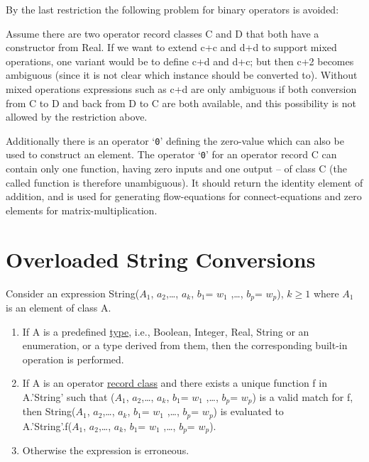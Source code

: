 \begin{nonnormative}
By the last restriction the following problem for binary
operators is avoided:

Assume there are two operator record classes C and D that both
have a constructor from Real. If we want to extend c+c and d+d to
support mixed operations, one variant would be to define c+d and d+c;
but then c+2 becomes ambiguous (since it is not clear which instance
should be converted to). Without mixed operations expressions such as
c+d are only ambiguous if both conversion from C to D and back from D to
C are both available, and this possibility is not allowed by the
restriction above.
\end{nonnormative}

Additionally there is an operator `\lstinline!0!' defining the zero-value which can
also be used to construct an element. The operator `\lstinline!0!' for an operator
record C can contain only one function, having zero inputs and one
output -- of class C (the called function is therefore unambiguous). It
should return the identity element of addition, and is used for
generating flow-equations for connect-equations and zero elements for
matrix-multiplication.

\section{Overloaded String Conversions}

Consider an expression String($A_1$,
$a_{2}$,\ldots{}, $a_{k}$, $b_{1}$=
$w_{1}$ ,\ldots{}, $b_{p}$= $w_{p}$), $k\ge 1$ where $A_1$ is an element of class A.

\begin{enumerate}
\item
  If A is a predefined \underline{type}, i.e., Boolean, Integer, Real, String or
  an enumeration, or a type derived from them, then the corresponding
  built-in operation is performed.
\item
  If A is an operator \underline{record class} and there exists a unique function
  f in A.'String' such that ($A_1$,
  $a_{2}$,\ldots{}, $a_{k}$, $b_{1}$=
  $w_{1}$ ,\ldots{}, $b_{p}$= $w_{p}$)
  is a valid match for f, then String($A_1$,
  $a_{2}$,\ldots{}, $a_{k}$, $b_{1}$=
  $w_{1}$ ,\ldots{}, $b_{p}$= $w_{p}$)
  is evaluated to\\
  A.'String'.f($A_1$, $a_{2}$,\ldots{},
  $a_{k}$, $b_{1}$= $w_{1}$ ,\ldots{},
  $b_{p}$= $w_{p}$).
\item
  Otherwise the expression is erroneous.
\end{enumerate}

